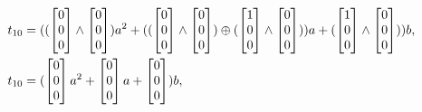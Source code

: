 \begin{equation*}
    \begin{split}
        t_{10} &= ((\begin{bmatrix} 0\\ 0\\ 0 \end{bmatrix} \wedge \begin{bmatrix} 0\\ 0\\ 0 \end{bmatrix})a^2 + ((\begin{bmatrix} 0\\ 0\\ 0 \end{bmatrix} \wedge \begin{bmatrix} 0\\ 0\\ 0 \end{bmatrix}) \xor (\begin{bmatrix} 1\\ 0\\ 0 \end{bmatrix} \wedge \begin{bmatrix} 0\\ 0\\ 0 \end{bmatrix}))a + (\begin{bmatrix} 1\\ 0\\ 0 \end{bmatrix} \wedge \begin{bmatrix} 0\\ 0\\ 0 \end{bmatrix}))b,\\
        t_{10} &= (\begin{bmatrix} 0\\ 0\\ 0 \end{bmatrix}a^2 + \begin{bmatrix} 0\\ 0\\ 0 \end{bmatrix}a + \begin{bmatrix} 0\\ 0\\ 0 \end{bmatrix})b,\\

\end{split}
\end{equation*}

